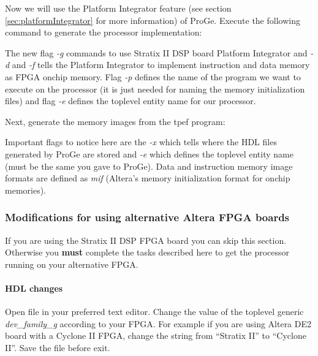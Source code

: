 \documentclass[twoside]{tceusermanual}
\begin{document}
Now we will use the Platform Integrator feature (see section
\ref{sec:platformIntegrator} for more information) of ProGe. Execute
the following command to generate the processor implementation:


The new flag \textit{-g} commands to use Stratix II DSP board Platform
Integrator and \textit{-d} and \textit{-f} tells the Platform
Integrator to implement instruction and data memory as FPGA onchip
memory. Flag \textit{-p} defines the name of the program we want to
execute on the processor (it is just needed for naming the memory
initialization files) and flag \textit{-e} defines the toplevel entity
name for our processor.

Next, generate the memory images from the tpef program:


Important flags to notice here are the \textit{-x} which tells where
the HDL files generated by ProGe are stored and \textit{-e} which
defines the toplevel entity name (must be the same you gave to
ProGe). Data and instruction memory image formats are defined as
\textit{mif} (Altera's memory initialization format for onchip
memories).


\subsubsection{Modifications for using alternative Altera FPGA boards}

If you are using the Stratix II DSP FPGA board you can skip this
section. Otherwise you \textbf{must} complete the tasks described here
to get the processor running on your alternative FPGA.

\paragraph{HDL changes}

Open file  in your
preferred text editor. Change the value of the toplevel generic
\textit{dev\_family\_g} according to your FPGA. For example if you are
using Altera DE2 board with a Cyclone II FPGA, change the string from
``Stratix II'' to ``Cyclone II''. Save the file before exit.
\end{document}
